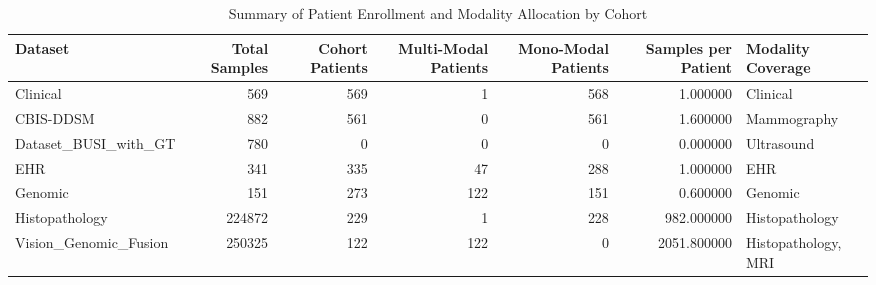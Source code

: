 \begin{table}
\caption{Summary of Patient Enrollment and Modality Allocation by Cohort}
\label{tab:table_p2_patient_statistics}
\begin{tabular}{lrrrrrl}
\toprule
Dataset & Total Samples & Cohort Patients & Multi-Modal Patients & Mono-Modal Patients & Samples per Patient & Modality Coverage \\
\midrule
Clinical & 569 & 569 & 1 & 568 & 1.000000 & Clinical \\
CBIS-DDSM & 882 & 561 & 0 & 561 & 1.600000 & Mammography \\
Dataset\_BUSI\_with\_GT & 780 & 0 & 0 & 0 & 0.000000 & Ultrasound \\
EHR & 341 & 335 & 47 & 288 & 1.000000 & EHR \\
Genomic & 151 & 273 & 122 & 151 & 0.600000 & Genomic \\
Histopathology & 224872 & 229 & 1 & 228 & 982.000000 & Histopathology \\
Vision\_Genomic\_Fusion & 250325 & 122 & 122 & 0 & 2051.800000 & Histopathology, MRI \\
\bottomrule
\end{tabular}
\end{table}
